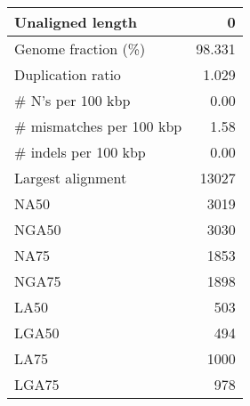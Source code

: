 \documentclass[12pt,a4paper]{article}
\begin{document}
\begin{table}[ht]
\begin{center}
\begin{tabular}{|l*{1}{|r}|}
Unaligned length & 0 \\ \hline
Genome fraction (\%) & 98.331 \\ \hline
Duplication ratio & 1.029 \\ \hline
\# N's per 100 kbp & 0.00 \\ \hline
\# mismatches per 100 kbp & 1.58 \\ \hline
\# indels per 100 kbp & 0.00 \\ \hline
Largest alignment & 13027 \\ \hline
NA50 & 3019 \\ \hline
NGA50 & 3030 \\ \hline
NA75 & 1853 \\ \hline
NGA75 & 1898 \\ \hline
LA50 & 503 \\ \hline
LGA50 & 494 \\ \hline
LA75 & 1000 \\ \hline
LGA75 & 978 \\ \hline
\end{tabular}
\end{center}
\end{table}
\end{document}
